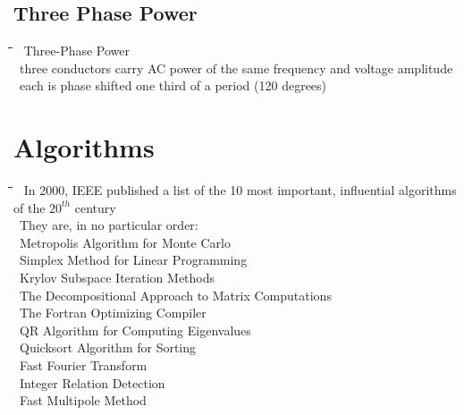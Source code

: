 \documentclass[10pt,letterpaper]{scrartcl}
\newcommand{\tbul}{\textbullet}
\newcommand{\tend}{\>\textendash}
\newcommand{\tasc}{\>\>\textasteriskcentered}
\newcommand{\tabDef}{\hspace{2em}\=\hspace{2em}\=\hspace{2em}\=\hspace{2em}\=\kill}
\begin{document}
\subsection{Three Phase Power}
\begin{tabbing}\tabDef 
\tbul\ Three-Phase Power \\
    \tend\ three conductors carry AC power of the same frequency and voltage amplitude \\
        \tasc\ each is phase shifted one third of a period (120 degrees)
\end{tabbing}

\newpage 
\section{Algorithms}
\begin{tabbing}\tabDef
\tbul\ In 2000, IEEE published a list of the 10 most important, influential algorithms of the $20^{th}$ century \\
\tbul\ They are, in no particular order: \\
	\tend\ Metropolis Algorithm for Monte Carlo \\
    \tend\ Simplex Method for Linear Programming \\
    \tend\ Krylov Subspace Iteration Methods\\
    \tend\ The Decompositional Approach to Matrix Computations \\
    \tend\ The Fortran Optimizing Compiler\\
    \tend\ QR Algorithm for Computing Eigenvalues\\
    \tend\ Quicksort Algorithm for Sorting \\
    \tend\ Fast Fourier Transform \\
    \tend\ Integer Relation Detection\\
    \tend\ Fast Multipole Method
\end{tabbing}
\end{document}
